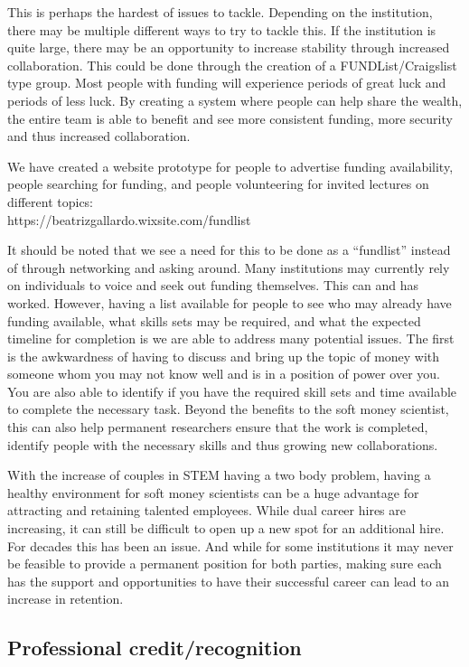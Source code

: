 \documentclass[letterpaper, 12pt]{article}
\begin{document}
This is perhaps the hardest of issues to tackle. Depending on the institution, there may be multiple different ways to try to tackle this. If the institution is quite large, there may be an opportunity to increase stability through increased collaboration. This could be done through the creation of a FUNDList/Craigslist type group. Most people with funding will experience periods of great luck and periods of less luck. By creating a system where people can help share the wealth, the entire team is able to benefit and see more consistent funding, more security and thus increased collaboration. 

We have created a website prototype for people to advertise funding availability, people searching for funding, and people volunteering for invited lectures on different topics:\\
https://beatrizgallardo.wixsite.com/fundlist

It should be noted that we see a need for this to be done as a “fundlist” instead of through networking and asking around. Many institutions may currently rely on individuals to voice and seek out funding themselves. This can and has worked. However, having a list available for people to see who may already have funding available, what skills sets may be required, and what the expected timeline for completion is we are able to address many potential issues. The first is the awkwardness of having to discuss and bring up the topic of money with someone whom you may not know well and is in a position of power over you. You are also able to identify if you have the required skill sets and time available to complete the necessary task. Beyond the benefits to the soft money scientist, this can also help permanent researchers ensure that the work is completed, identify people with the necessary skills and thus growing new collaborations. 

With the increase of couples in STEM having a two body problem, having a healthy environment for soft money scientists can be a huge advantage for attracting and retaining talented employees. While dual career hires are increasing, it can still be difficult to open up a new spot for an additional hire. For decades this has been an issue. And while for some institutions it may never be feasible to provide a permanent position for both parties, making sure each has the support and opportunities to have their successful career can lead to an increase in retention. 


\subsection{Professional credit/recognition}
\end{document}
